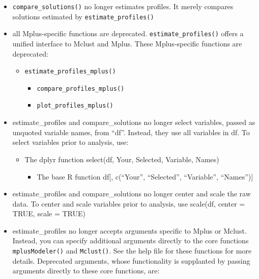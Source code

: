 \documentclass[man]{apa6}
\providecommand{\tightlist}{%
  \setlength{\itemsep}{0pt}\setlength{\parskip}{0pt}}
\begin{document}
\begin{itemize}
\item
  \texttt{compare\_solutions()} no longer estimates profiles. It merely
  compares solutions estimated by \texttt{estimate\_profiles()}
\item
  all Mplus-specific functions are deprecated.
  \texttt{estimate\_profiles()} offers a unified interface to Mclust and
  Mplus. These Mplus-specific functions are deprecated:

  \begin{itemize}
  \tightlist
  \item
    \texttt{estimate\_profiles\_mplus()}

    \begin{itemize}
    \tightlist
    \item
      \texttt{compare\_profiles\_mplus()}
    \item
      \texttt{plot\_profiles\_mplus()}
    \end{itemize}
  \end{itemize}
\item
  estimate\_profiles and compare\_solutions no longer select variables,
  passed as unquoted variable names, from \enquote{df}. Instead, they
  use all variables in df. To select variables prior to analysis, use:

  \begin{itemize}
  \tightlist
  \item
    The dplyr function select(df, Your, Selected, Variable, Names)

    \begin{itemize}
    \tightlist
    \item
      The base R function df{[}, c(\enquote{Your}, \enquote{Selected},
      \enquote{Variable}, \enquote{Names}){]}
    \end{itemize}
  \end{itemize}
\item
  estimate\_profiles and compare\_solutions no longer center and scale
  the raw data. To center and scale variables prior to analysis, use
  scale(df, center = TRUE, scale = TRUE)
\item
  estimate\_profiles no longer accepts arguments specific to Mplus or
  Mclust. Instead, you can specify additional arguments directly to the
  core functions \texttt{mplusModeler()} and \texttt{Mclust()}. See the
  help file for these functions for more details. Deprecated arguments,
  whose functionality is supplanted by passing arguments directly to
  these core functions, are:
\end{itemize}
\end{document}
